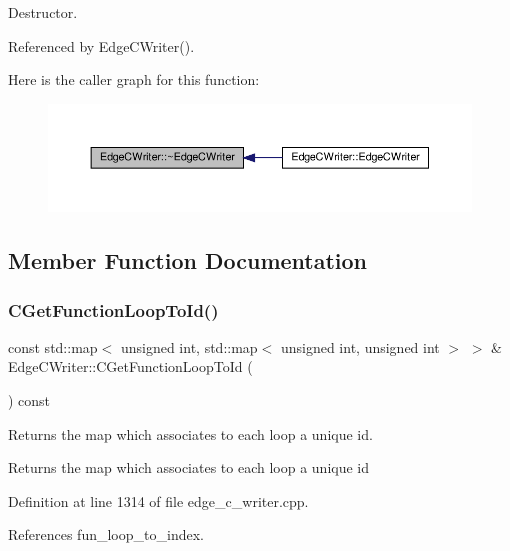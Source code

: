 Destructor. 



Referenced by Edge\+C\+Writer().

Here is the caller graph for this function\+:
\nopagebreak
\begin{figure}[H]
\begin{center}
\leavevmode
\includegraphics[width=350pt]{d7/dee/classEdgeCWriter_af374509bd9ecd11aa640c9fd71593113_icgraph}
\end{center}
\end{figure}


\subsection{Member Function Documentation}
\mbox{\label{classEdgeCWriter_afcf0813b40974ad65e3e4ba991ab070f}} 
\subsubsection{\texorpdfstring{C\+Get\+Function\+Loop\+To\+Id()}{CGetFunctionLoopToId()}}
{\footnotesize\ttfamily const std\+::map$<$ unsigned int, std\+::map$<$ unsigned int, unsigned int $>$ $>$ \& Edge\+C\+Writer\+::\+C\+Get\+Function\+Loop\+To\+Id (\begin{DoxyParamCaption}{ }\end{DoxyParamCaption}) const}



Returns the map which associates to each loop a unique id. 

\begin{DoxyReturn}{Returns}
the map which associates to each loop a unique id 
\end{DoxyReturn}


Definition at line 1314 of file edge\+\_\+c\+\_\+writer.\+cpp.



References fun\+\_\+loop\+\_\+to\+\_\+index.


